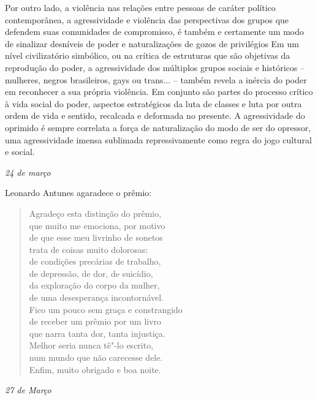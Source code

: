 Por outro lado, a violência nas relações entre pessoas de caráter
político contemporânea, a agressividade e violência das perspectivas dos
grupos que defendem suas comunidades de compromisso, é também e
certamente um modo de sinalizar desníveis de poder e naturalizações de
gozos de privilégios Em um nível civilizatório simbólico, ou na crítica
de estruturas que são objetivas da reprodução do poder, a agressividade
dos múltiplos grupos sociais e históricos -- mulheres, negros
brasileiros, gays ou trans... -- também revela a inércia do poder em
reconhecer a sua própria violência. Em conjunto são partes do processo
crítico à vida social do poder, aspectos estratégicos da luta de classes
e luta por outra ordem de vida e sentido, recalcada e deformada no
presente. A agressividade do oprimido é sempre correlata a força de
naturalização do modo de ser do opressor, uma agressividade imensa
sublimada repressivamente como regra do jogo cultural e social.

\begin{flushright}
\emph{24 de março}
\end{flushright}

\noindent Leonardo Antunes agaradece o prêmio:

\begin{verse}
Agradeço esta distinção do prêmio, \\
que muito me emociona, por motivo \\
de que esse meu livrinho de sonetos \\
trata de coisas muito dolorosas: \\
de condições precárias de trabalho, \\
de depressão, de dor, de suicídio, \\
da exploração do corpo da mulher, \\
de uma desesperança incontornável. \\
Fico um pouco sem graça e constrangido \\
de receber um prêmio por um livro \\
que narra tanta dor, tanta injustiça. \\
Melhor seria nunca tê"-lo escrito, \\
num mundo que não carecesse dele. \\
Enfim, muito obrigado e boa noite. \\
\end{verse}

\begin{flushright}
\emph{27 de Março}
\end{flushright}

